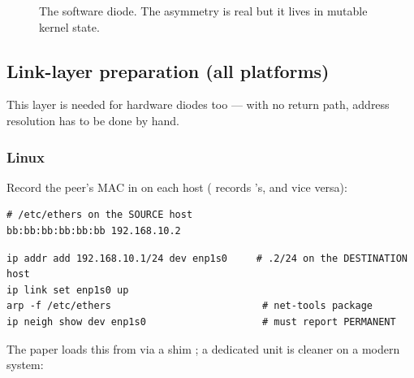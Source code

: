 \documentclass[11pt,a4paper]{article}
\begin{document}
\begin{figure}[h]
\centering
{}
\caption{The software diode. The asymmetry is real but it lives in mutable
         kernel state.}
\end{figure}

\subsection{Link-layer preparation (all platforms)}
\label{sec:linklayer}

This layer is needed for hardware diodes too --- with no return path, address
resolution has to be done by hand.

\subsubsection{Linux}

Record the peer's MAC in  on each host (\srcside{} records
\dstside{}'s, and vice versa):

\begin{lstlisting}[style=conf]
# /etc/ethers on the SOURCE host
bb:bb:bb:bb:bb:bb 192.168.10.2
\end{lstlisting}

\begin{lstlisting}[style=shell]
ip addr add 192.168.10.1/24 dev enp1s0     # .2/24 on the DESTINATION host
ip link set enp1s0 up
arp -f /etc/ethers                          # net-tools package
ip neigh show dev enp1s0                    # must report PERMANENT
\end{lstlisting}

The paper loads this from  via a 
shim \cite{anton2024}; a dedicated unit is cleaner on a modern system:
\end{document}
